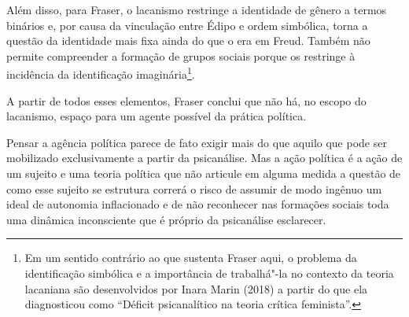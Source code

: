 Além disso, para Fraser, o lacanismo restringe a identidade de gênero a
termos binários e, por causa da vinculação entre Édipo e ordem
simbólica, torna a questão da identidade mais fixa ainda do que o era em
Freud. Também não permite compreender a formação de grupos sociais
porque os restringe à incidência da identificação imaginária\footnote{Em
  um sentido contrário ao que sustenta Fraser aqui, o problema da
  identificação simbólica e a importância de trabalhá"-la no contexto da
  teoria lacaniana são desenvolvidos por Inara Marin (2018) a partir do
  que ela diagnosticou como ``Déficit psicanalítico na teoria crítica
  feminista''.}.

A partir de todos esses elementos, Fraser conclui que não há, no escopo
do lacanismo, espaço para um agente possível da prática política.

Pensar a agência política parece de fato exigir mais do que aquilo que
pode ser mobilizado exclusivamente a partir da psicanálise. Mas a ação
política é a ação de um sujeito e uma teoria política que não articule
em alguma medida a questão de como esse sujeito se estrutura correrá o
risco de assumir de modo ingênuo um ideal de autonomia inflacionado e de
não reconhecer nas formações sociais toda uma dinâmica inconsciente que
é próprio da psicanálise esclarecer.

